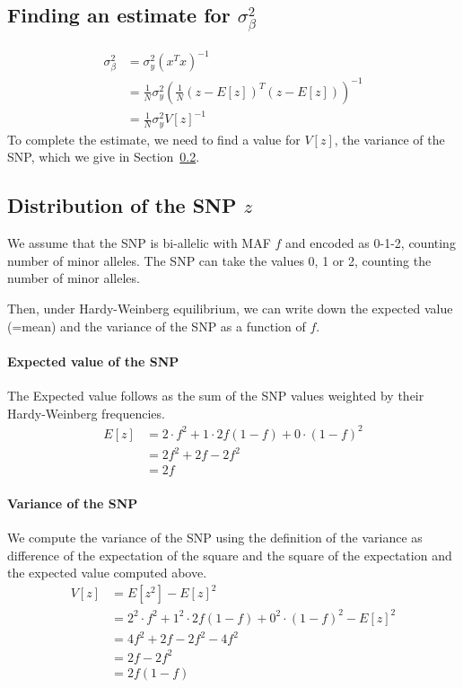 \documentclass{scrartcl}
\begin{document}
\subsection{Finding an estimate for $\sigma_\beta^2$}
\label{sec:var_beta}
\begin{align}
\sigma_\beta^2 &= \sigma_y^2 (x^T x)^{-1}
\\
&=
\frac{1}{N} \sigma_y^2 \left(\frac{1}{N} \left(z-E[z]\right)^T \left(z-E[z]\right)\right)^{-1}
\\
&=
\frac{1}{N} \sigma_y^2 V[z]^{-1}
\end{align}
To complete the estimate, we need to find a value for $V[z]$, the variance of the SNP, which we give in Section~\ref{sec:var_snp}.
\subsection{ Distribution of the SNP $z$}
\label{sec:var_snp}
We assume that the SNP is bi-allelic with MAF $f$ and encoded as 0-1-2, counting number of minor alleles.
The SNP can take the values 0, 1 or 2, counting the number of minor alleles.

Then, under Hardy-Weinberg equilibrium, we can write down the expected value (=mean) and the variance of the SNP as a function of $f$.
\paragraph{Expected value of the SNP}
The Expected value follows as the sum of the SNP values weighted by their Hardy-Weinberg frequencies.
\begin{align}
E[z] &= 2 \cdot f^2 + 1 \cdot 2f(1-f) + 0 \cdot (1-f)^2
\\
&=
2 f^2 + 2f -2f^2
\\
&=
2f
\end{align}
\paragraph{Variance of the SNP}
We compute the variance of the SNP using the definition of the variance as difference of the expectation of the square and the square of the expectation and the expected value computed above.
\begin{align}
V[z] &= E[z^2] - E[z]^2 
\\&= 
2^2 \cdot f^2 + 1^2 \cdot 2f(1-f) + 0^2 \cdot (1-f)^2 - E[z]^2 
\\
&=
4 f^2 + 2f -2f^2 - 4f^2 
\\
&=
2f - 2f^2
\\
&=
2f(1-f)
\end{align}



\end{document}
